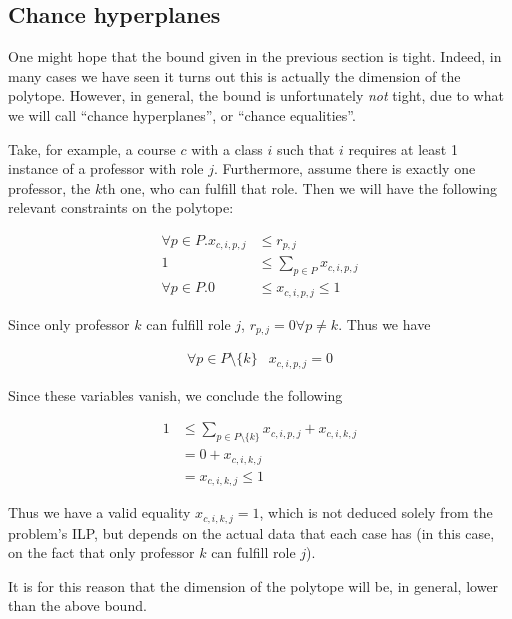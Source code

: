 \subsection{Chance hyperplanes}

One might hope that the bound given in the previous section is tight. Indeed, in many cases we have seen it turns out this is actually the dimension of the polytope. However, in general, the bound is unfortunately \emph{not} tight, due to what we will call ``chance hyperplanes'', or ``chance equalities''.

Take, for example, a course $c$ with a class $i$ such that $i$ requires at least 1 instance of a professor with role $j$. Furthermore, assume there is exactly one professor, the $k$th one, who can fulfill that role. Then we will have the following relevant constraints on the polytope:

\begin{align*}
\forall p \in P. x_{c, i, p, j} &\le r_{p, j}\\
1 &\le \sum_{p \in P} x_{c, i, p, j}\\
\forall p \in P. 0 &\le x_{c, i, p, j} \le 1
\end{align*}

Since only professor $k$ can fulfill role $j$, $r_{p, j} = 0 \forall p \ne k$. Thus we have

\begin{align*}
\forall p \in P \setminus \{k\} & x_{c, i, p, j} = 0
\end{align*}

Since these variables vanish, we conclude the following

\begin{align*}
1 &\le \sum_{p \in P \setminus \{k\}} x_{c, i, p, j} + x_{c, i, k, j}\\
  &= 0 + x_{c, i, k, j}\\
  &= x_{c, i, k, j} \le 1
\end{align*}

Thus we have a valid equality $x_{c, i, k, j} = 1$, which is not deduced solely from the problem's ILP, but depends on the actual data that each case has (in this case, on the fact that only professor $k$ can fulfill role $j$).

It is for this reason that the dimension of the polytope will be, in general, lower than the above bound.

